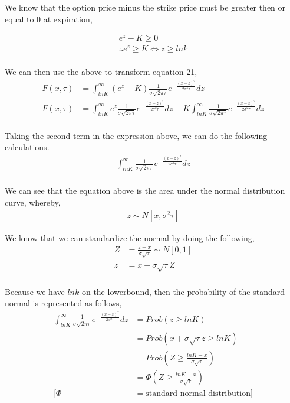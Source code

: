 \documentclass[12pt]{article}
\begin{document}
We know that the option price minus the strike price must be greater then or equal to 0 at expiration,

\begin{align*}
e^{z} - K \geq 0 \\
\therefore e^{z} \geq K \iff z \geq ln{k} \\
\end{align*}

We can then use the above to transform equation 21,
\begin{align*}
F(x,\tau) &= \int_{ln{K}}^{\infty}(e^{z}-K)\frac{1}{\sigma\sqrt{2 \pi \tau}}e^{-\frac{(x-z)^2}{2\sigma ^2\tau}}dz \\
F(x,\tau) &= \int_{ln{K}}^{\infty}e^{z}\frac{1}{\sigma\sqrt{2 \pi \tau}}e^{-\frac{(x-z)^2}{2\sigma ^2\tau}}dz - K\int_{ln{K}}^{\infty}\frac{1}{\sigma\sqrt{2 \pi \tau}}e^{-\frac{(x-z)^2}{2\sigma ^2\tau}}dz\\
\end{align*}

Taking the second term in the expression above, we can do the following calculations. 
\begin{align*}
\int_{ln{K}}^{\infty}\frac{1}{\sigma\sqrt{2 \pi \tau}}e^{-\frac{(x-z)^2}{2\sigma ^2\tau}}dz\\
\end{align*}

We can see that the equation above is the area under the normal distribution curve, whereby,
\begin{align*}
z \sim N[x, \sigma ^2 \tau]
\end{align*}

We know that we can standardize the normal by doing the following,
\begin{align*}
Z &= \frac{z-x}{\sigma \sqrt{\tau}} \sim N[0,1] \\
z &= x + \sigma \sqrt{\tau}Z \\
\end{align*}


Because we have $ln{k}$ on the lowerbound, then the probability of the standard normal is represented as follows,
\begin{align*}
\int_{ln{K}}^{\infty} \frac{1}{\sigma \sqrt{2 \pi \tau}} e^{-\frac{(x-z)^2}{2\sigma ^2 \tau}}dz &= Prob(z \geq ln{K}) \\
&= Prob(x + \sigma \sqrt{\tau}z \geq ln{K}) \\
&= Prob(Z \geq \frac{ln{K} - x}{\sigma \sqrt{\tau}}) \\
&= \Phi(Z \geq \frac{ln{K} - x}{\sigma \sqrt{\tau}}) \\
[\Phi &= \text{standard normal distribution}] \\
\end{align*}
\end{document}
